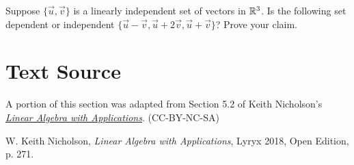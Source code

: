 \documentclass{ximera}
\begin{document}
\begin{problem}\label{prob:OtherLinearComb2}
Suppose $\{{\vec{u}},{\vec{v}}\}$ is a linearly independent set of vectors in $\mathbb{R}^3$.  Is the following set dependent or independent $\{\vec{u} -\vec{v}, \vec{u}+2\vec{v}, \vec{u}+\vec{v}\}$? Prove your claim.
\end{problem}

\section*{Text Source} A portion of this section was adapted from Section 5.2 of Keith Nicholson's \href{https://open.umn.edu/opentextbooks/textbooks/linear-algebra-with-applications}{\it Linear Algebra with Applications}. (CC-BY-NC-SA)
 
W. Keith Nicholson, {\it Linear Algebra with Applications}, Lyryx 2018, Open Edition, p. 271.
\end{document}
